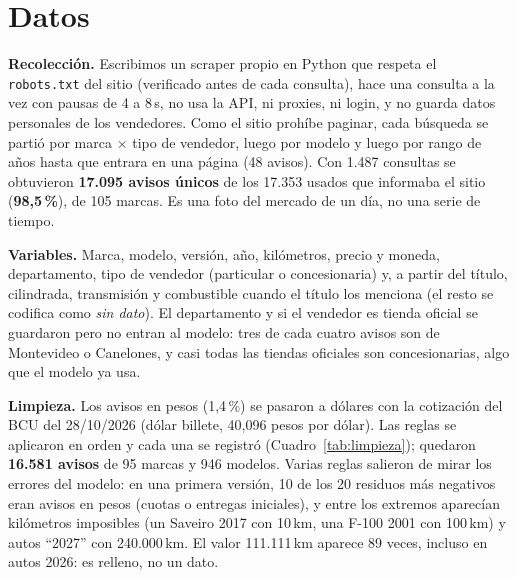 \documentclass[11pt,a4paper]{article}
\begin{document}
\section{Datos}

\textbf{Recolección.} Escribimos un scraper propio en Python que respeta el \texttt{robots.txt} del
sitio (verificado antes de cada consulta), hace una consulta a la vez con pausas de 4 a 8\,s, no usa
la API, ni proxies, ni login, y no guarda datos personales de los vendedores. Como el sitio prohíbe
paginar, cada búsqueda se partió por marca $\times$ tipo de vendedor, luego por modelo y luego por rango
de años hasta que entrara en una página (48 avisos). Con 1.487 consultas se obtuvieron
\textbf{17.095 avisos únicos} de los 17.353 usados que informaba el sitio (\textbf{98,5\,\%}), de 105
marcas. Es una foto del mercado de un día, no una serie de tiempo.

\textbf{Variables.} Marca, modelo, versión, año, kilómetros, precio y moneda, departamento, tipo de
vendedor (particular o concesionaria) y, a partir del título, cilindrada, transmisión y combustible
cuando el título los menciona (el resto se codifica como \emph{sin dato}). El departamento y si el
vendedor es tienda oficial se guardaron pero no entran al modelo: tres de cada cuatro avisos son de
Montevideo o Canelones, y casi todas las tiendas oficiales son concesionarias, algo que el modelo ya usa.

\textbf{Limpieza.} Los avisos en pesos (1,4\,\%) se pasaron a dólares con la cotización del BCU del 28/10/2026
(dólar billete, 40,096 pesos por dólar). Las reglas se aplicaron en orden y cada una se registró
(Cuadro~\ref{tab:limpieza}); quedaron \textbf{16.581 avisos} de 95 marcas y 946 modelos. Varias reglas
salieron de mirar los errores del modelo: en una primera versión, 10 de los 20 residuos más negativos
eran avisos en pesos (cuotas o entregas iniciales), y entre los extremos aparecían kilómetros
imposibles (un Saveiro 2017 con 10\,km, una F-100 2001 con 100\,km) y autos ``2027'' con 240.000\,km.
El valor 111.111\,km aparece 89 veces, incluso en autos 2026: es relleno, no un dato.
\end{document}
